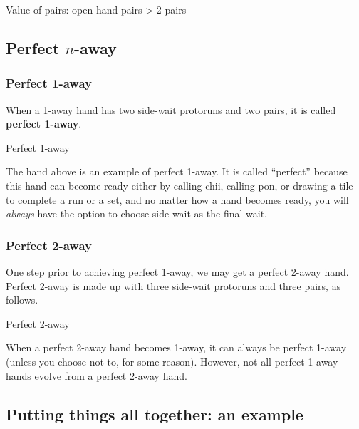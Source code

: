 \bigskip

\color{MyRed}
\begin{itembox}[c]{Value of pairs: open hand}
\centering{} pairs > 2 pairs
\end{itembox}\normalcolor

\bigskip

\subsection{Perfect $n$-away}\label{sec:perfect}

\subsubsection{Perfect 1-away} 
When a 1-away hand has two side-wait protoruns and two pairs, it is called {\bf perfect 1-away}. 
\bigskip
\begin{itembox}[r]{Perfect 1-away}
\bp
{}\bai\bai\bai\\
\ep
\end{itembox}
The hand above is an example of perfect 1-away. It is called ``perfect'' because this hand can become ready either by calling {\jap chii}, calling {\jap pon}, or drawing a tile to complete a run or a set, and no matter how a hand becomes ready, you will \emph{always} have the option to choose side wait as the final wait.

\subsubsection{Perfect 2-away}
One step prior to achieving perfect 1-away, we may get a perfect 2-away hand. Perfect 2-away is made up with three side-wait protoruns and three pairs, as follows.
\bigskip
\begin{itembox}[r]{Perfect 2-away}
\bp
{}\bai\bai\bai\\
\ep
\end{itembox}
When a perfect 2-away hand becomes 1-away, it can always be perfect 1-away (unless you choose not to, for some reason). However, not all perfect 1-away hands evolve from a perfect 2-away hand. 

\newpage
\subsection{Putting things all together: an example}\label{sec:ptat}

